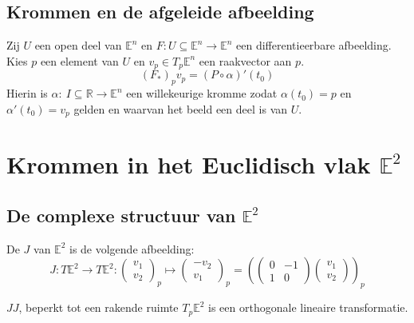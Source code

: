 \documentclass[main.tex]{subfiles}
\begin{document}
\section{Krommen en de afgeleide afbeelding}
\label{sec:krommen-en-de}

\begin{st}
  Zij $U$ een open deel van $\mathbb{E}^{n}$ en $F: U \subseteq \mathbb{E}^{n} \rightarrow \mathbb{E}^{n}$ een differentieerbare afbeelding.
  Kies $p$ een element van $U$ en $v_{p}\in T_{p}\mathbb{E}^{n}$ een raakvector aan $p$.
  \[ (F_{*})_{p}v_{p} = (P \circ \alpha)'(t_{0}) \]
  Hierin is $\alpha:\ I \subseteq \mathbb{R} \rightarrow \mathbb{E}^{n}$ een willekeurige kromme zodat $\alpha(t_{0}) = p$ en $\alpha'(t_{0}) = v_{p}$ gelden en waarvan het beeld een deel is van $U$.
\end{st}


\chapter{Krommen in het Euclidisch vlak $\mathbb{E}^{2}$}
\label{cha:kromm-het-eucl}

\section{De complexe structuur van $\mathbb{E}^{2}$}
\label{sec:de-compl-struct}

\begin{de}
  De  $J$ van $\mathbb{E}^{2}$ is de volgende afbeelding:
  \[
  J: T\mathbb{E}^{2} \rightarrow T\mathbb{E}^{2}: 
  \begin{pmatrix}
    v_{1}\\v_{2}
  \end{pmatrix}_{p}
  \mapsto
  \begin{pmatrix}
    -v_{2}\\v_{1}
  \end{pmatrix}_{p}
  =
  \left(
    \begin{pmatrix}
      0 & -1\\
      1 & 0
    \end{pmatrix}
    \begin{pmatrix}
      v_{1}\\v_{2}
    \end{pmatrix}
  \right)_{p}
  \]
\end{de}

\begin{st}
  $JJ$, beperkt tot een rakende ruimte $T_{p}\mathbb{E}^{2}$  is een orthogonale lineaire transformatie.
\end{st}
\end{document}
